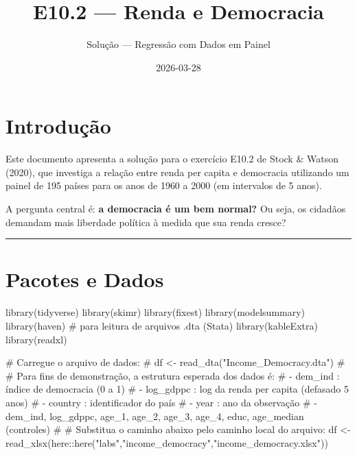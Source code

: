 \documentclass[
  portuguese,
  letterpaper,
  DIV=11,
  numbers=noendperiod]{scrartcl}
\title{E10.2 --- Renda e Democracia}
\subtitle{Solução --- Regressão com Dados em Painel}
\author{}
\date{2026-03-28}
\newenvironment{Shaded}{\begin{snugshade}}{\end{snugshade}}
\newcommand{\CommentTok}[1]{\textcolor[rgb]{0.37,0.37,0.37}{#1}}
\newcommand{\FunctionTok}[1]{\textcolor[rgb]{0.28,0.35,0.67}{#1}}
\newcommand{\NormalTok}[1]{\textcolor[rgb]{0.00,0.23,0.31}{#1}}
\newcommand{\OtherTok}[1]{\textcolor[rgb]{0.00,0.23,0.31}{#1}}
\newcommand{\SpecialCharTok}[1]{\textcolor[rgb]{0.37,0.37,0.37}{#1}}
\newcommand{\StringTok}[1]{\textcolor[rgb]{0.13,0.47,0.30}{#1}}
\renewcommand*\contentsname{Índice}
\newcommand\contentsname{Índice}
\begin{document}
\maketitle

\renewcommand*\contentsname{Índice}
{
\hypersetup{linkcolor=}
\setcounter{tocdepth}{3}
\tableofcontents
}

\section{Introdução}\label{introduuxe7uxe3o}

Este documento apresenta a solução para o exercício E10.2 de Stock \&
Watson (2020), que investiga a relação entre renda per capita e
democracia utilizando um painel de 195 países para os anos de 1960 a
2000 (em intervalos de 5 anos).

A pergunta central é: \textbf{a democracia é um bem normal?} Ou seja, os
cidadãos demandam mais liberdade política à medida que sua renda cresce?

\begin{center}\rule{0.5\linewidth}{0.5pt}\end{center}

\section{Pacotes e Dados}\label{pacotes-e-dados}

\begin{Shaded}
\begin{Highlighting}[]
\FunctionTok{library}\NormalTok{(tidyverse)}
\FunctionTok{library}\NormalTok{(skimr)}
\FunctionTok{library}\NormalTok{(fixest)}
\FunctionTok{library}\NormalTok{(modelsummary)}
\FunctionTok{library}\NormalTok{(haven)      }\CommentTok{\# para leitura de arquivos .dta (Stata)}
\FunctionTok{library}\NormalTok{(kableExtra)}
\FunctionTok{library}\NormalTok{(readxl)}

\CommentTok{\# Carregue o arquivo de dados:}
\CommentTok{\# df \textless{}{-} read\_dta("Income\_Democracy.dta")}
\CommentTok{\#}
\CommentTok{\# Para fins de demonstração, a estrutura esperada dos dados é:}
\CommentTok{\#   {-} dem\_ind     : índice de democracia (0 a 1)}
\CommentTok{\#   {-} log\_gdppc   : log da renda per capita (defasado 5 anos)}
\CommentTok{\#   {-} country     : identificador do país}
\CommentTok{\#   {-} year        : ano da observação}
\CommentTok{\#   {-} dem\_ind, log\_gdppc, age\_1, age\_2, age\_3, age\_4, educ, age\_median (controles)}
\CommentTok{\#}
\CommentTok{\# Substitua o caminho abaixo pelo caminho local do arquivo:}
\NormalTok{df }\OtherTok{\textless{}{-}} \FunctionTok{read\_xlsx}\NormalTok{(here}\SpecialCharTok{::}\FunctionTok{here}\NormalTok{(}\StringTok{"labs"}\NormalTok{,}\StringTok{"income\_democracy"}\NormalTok{,}\StringTok{"income\_democracy.xlsx"}\NormalTok{))}
\end{Highlighting}
\end{Shaded}
\end{document}
